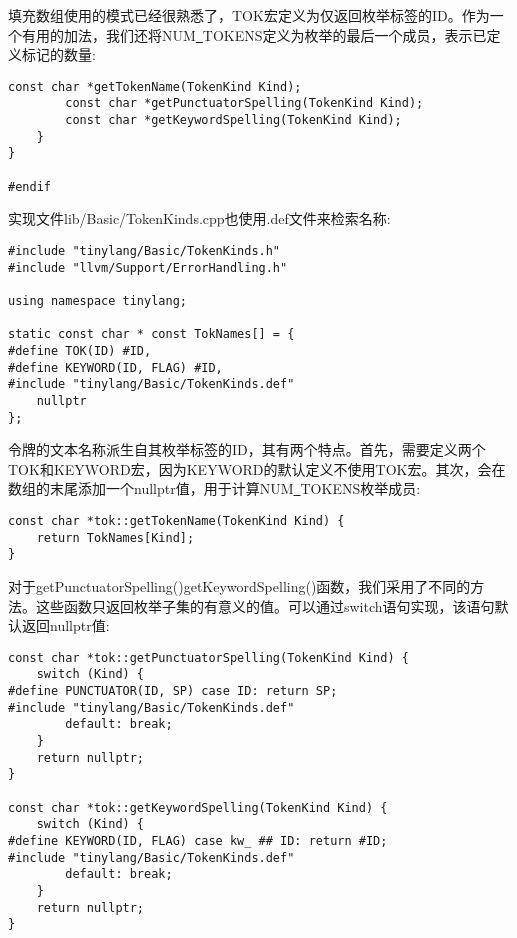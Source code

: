 填充数组使用的模式已经很熟悉了，TOK宏定义为仅返回枚举标签的ID。作为一个有用的加法，我们还将NUM\underline{~}TOKENS定义为枚举的最后一个成员，表示已定义标记的数量:\par

\begin{lstlisting}[caption={}]
		const char *getTokenName(TokenKind Kind);
		const char *getPunctuatorSpelling(TokenKind Kind);
		const char *getKeywordSpelling(TokenKind Kind);
	}
}

#endif
\end{lstlisting}

实现文件lib/Basic/TokenKinds.cpp也使用.def文件来检索名称:\par

\begin{lstlisting}[caption={}]
#include "tinylang/Basic/TokenKinds.h"
#include "llvm/Support/ErrorHandling.h"

using namespace tinylang;

static const char * const TokNames[] = {
#define TOK(ID) #ID,
#define KEYWORD(ID, FLAG) #ID,
#include "tinylang/Basic/TokenKinds.def"
	nullptr
};
\end{lstlisting}

令牌的文本名称派生自其枚举标签的ID，其有两个特点。首先，需要定义两个TOK和KEYWORD宏，因为KEYWORD的默认定义不使用TOK宏。其次，会在数组的末尾添加一个nullptr值，用于计算NUM\underline{~}TOKENS枚举成员:\par

\begin{lstlisting}[caption={}]
const char *tok::getTokenName(TokenKind Kind) {
	return TokNames[Kind];
}
\end{lstlisting}

对于getPunctuatorSpelling()getKeywordSpelling()函数，我们采用了不同的方法。这些函数只返回枚举子集的有意义的值。可以通过switch语句实现，该语句默认返回nullptr值:\par

\begin{lstlisting}[caption={}]
const char *tok::getPunctuatorSpelling(TokenKind Kind) {
	switch (Kind) {
#define PUNCTUATOR(ID, SP) case ID: return SP;
#include "tinylang/Basic/TokenKinds.def"
		default: break;
	}
	return nullptr;
}

const char *tok::getKeywordSpelling(TokenKind Kind) {
	switch (Kind) {
#define KEYWORD(ID, FLAG) case kw_ ## ID: return #ID;
#include "tinylang/Basic/TokenKinds.def"
		default: break;
	}
	return nullptr;
}
\end{lstlisting}

